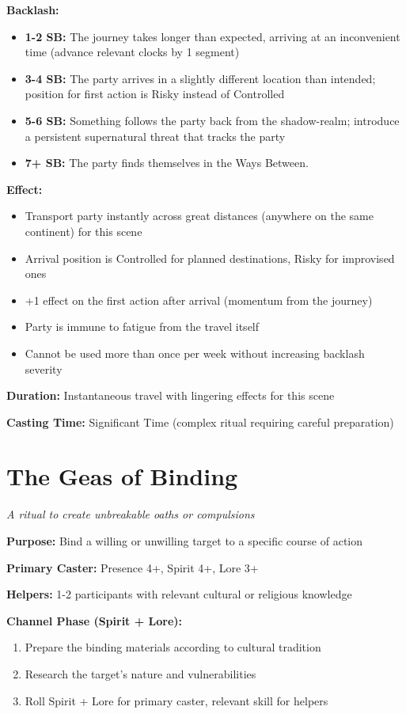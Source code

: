 \textbf{Backlash:}
\begin{itemize}
\item \textbf{1-2 SB:} The journey takes longer than expected, arriving at an inconvenient time (advance relevant clocks by 1 segment)
\item \textbf{3-4 SB:} The party arrives in a slightly different location than intended; position for first action is Risky instead of Controlled
\item \textbf{5-6 SB:} Something follows the party back from the shadow-realm; introduce a persistent supernatural threat that tracks the party
\item \textbf{7+ SB:} The party finds themselves in the Ways Between.
\end{itemize}

\textbf{Effect:}
\begin{itemize}
\item Transport party instantly across great distances (anywhere on the same continent) for this scene
\item Arrival position is Controlled for planned destinations, Risky for improvised ones
\item +1 effect on the first action after arrival (momentum from the journey)
\item Party is immune to fatigue from the travel itself
\item Cannot be used more than once per week without increasing backlash severity
\end{itemize}

\textbf{Duration:} Instantaneous travel with lingering effects for this scene

\textbf{Casting Time:} Significant Time (complex ritual requiring careful preparation)

\section*{The Geas of Binding}
\textit{A ritual to create unbreakable oaths or compulsions}

\textbf{Purpose:} Bind a willing or unwilling target to a specific course of action

\textbf{Primary Caster:} Presence 4+, Spirit 4+, Lore 3+

\textbf{Helpers:} 1-2 participants with relevant cultural or religious knowledge

\textbf{Channel Phase (Spirit + Lore):}
\begin{enumerate}
\item Prepare the binding materials according to cultural tradition
\item Research the target's nature and vulnerabilities
\item Roll Spirit + Lore for primary caster, relevant skill for helpers
\end{enumerate}

